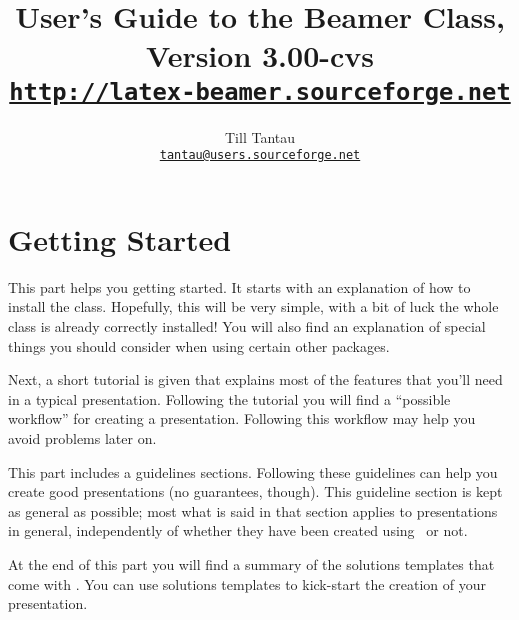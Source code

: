 \documentclass{ltxdoc}
\def\version{3.00-cvs}
\begin{document}

\title{User's Guide to the Beamer Class, Version \version\\
\Large\href{http://latex-beamer.sourceforge.net}{\texttt{http://latex-beamer.sourceforge.net}}}
\author{Till Tantau\\
  \href{mailto:tantau@users.sourceforge.net}{\texttt{tantau@users.sourceforge.net}}}

\maketitle

\tableofcontents






\part{Getting Started}

This part helps you getting started. It starts with an explanation of
how to install the class. Hopefully, this will be very simple, with a
bit of luck the whole class is already correctly installed! You will
also find an explanation of special things you should consider when
using certain other packages.

Next, a short tutorial is given that explains most of the features
that you'll need in a typical presentation. Following the tutorial you
will find a ``possible workflow'' for creating a
presentation. Following this workflow may help you avoid problems
later on.

This part includes a guidelines sections. Following these guidelines
can help you create good presentations (no guarantees, though). This
guideline section is kept as general as possible; most what is said in
that section applies to presentations in general, independently of
whether they have been created using \beamer\ or not.

At the end of this part you will find a summary of the solutions
templates that come with \beamer. You can use solutions templates to
kick-start the creation of your presentation.






\end{document}
